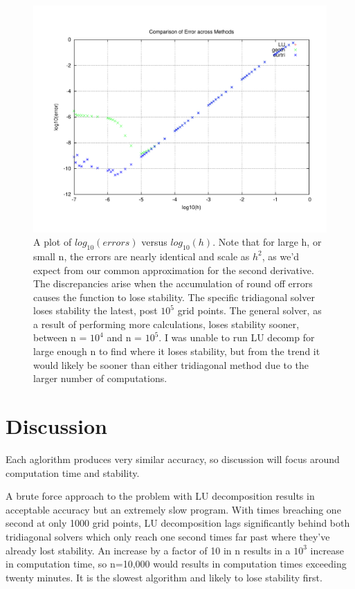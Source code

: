 \documentclass[11pt,a4paper]{article}
\begin{document}
\begin{figure}
\centering
\includegraphics[width=1.0\textwidth]{comparisonerror.pdf}
\caption{A plot of $log_{10}(errors)$ versus $log_{10}(h)$. Note that for large h, or small n, the errors are nearly identical and scale as $h^2$, as we'd expect from our common approximation for the second derivative. The discrepancies arise when the accumulation of round off errors causes the function to lose stability. The specific tridiagonal solver loses stability the latest, post $10^5$ grid points. The general solver, as a result of performing more calculations, loses stability sooner, between n = $10^4$ and n = $10^5$. I was unable to run LU decomp for large enough n to find where it loses stability, but from the trend it would likely be sooner than either tridiagonal method due to the larger number of computations.}
\end{figure}

\section{Discussion}

Each aglorithm produces very similar accuracy, so discussion will focus around computation time and stability.

A brute force approach to the problem with LU decomposition results in acceptable accuracy but an extremely slow program. With times breaching one second at only 1000 grid points, LU decomposition lags significantly behind both tridiagonal solvers which only reach one second times far past where they've already lost stability. An increase by a factor of 10 in n results in a $10^3$ increase in computation time, so n=10,000 would results in computation times exceeding twenty minutes. It is the slowest algorithm and likely to lose stability first.
\end{document}
